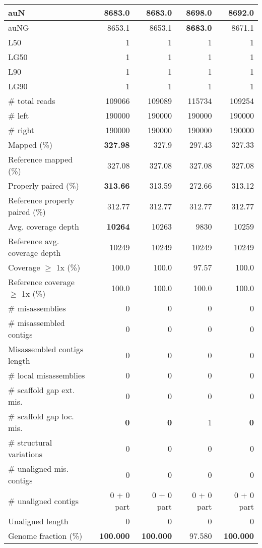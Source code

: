 \documentclass[12pt,a4paper]{article}
\begin{document}
\begin{table}[ht]
\begin{center}
\begin{tabular}{|l*{4}{|r}|}
auN & 8683.0 & 8683.0 & {\bf 8698.0} & 8692.0 \\ \hline
auNG & 8653.1 & 8653.1 & {\bf 8683.0} & 8671.1 \\ \hline
L50 & 1 & 1 & 1 & 1 \\ \hline
LG50 & 1 & 1 & 1 & 1 \\ \hline
L90 & 1 & 1 & 1 & 1 \\ \hline
LG90 & 1 & 1 & 1 & 1 \\ \hline
\# total reads & 109066 & 109089 & 115734 & 109254 \\ \hline
\# left & 190000 & 190000 & 190000 & 190000 \\ \hline
\# right & 190000 & 190000 & 190000 & 190000 \\ \hline
Mapped (\%) & {\bf 327.98} & 327.9 & 297.43 & 327.33 \\ \hline
Reference mapped (\%) & 327.08 & 327.08 & 327.08 & 327.08 \\ \hline
Properly paired (\%) & {\bf 313.66} & 313.59 & 272.66 & 313.12 \\ \hline
Reference properly paired (\%) & 312.77 & 312.77 & 312.77 & 312.77 \\ \hline
Avg. coverage depth & {\bf 10264} & 10263 & 9830 & 10259 \\ \hline
Reference avg. coverage depth & 10249 & 10249 & 10249 & 10249 \\ \hline
Coverage $\geq$ 1x (\%) & 100.0 & 100.0 & 97.57 & 100.0 \\ \hline
Reference coverage $\geq$ 1x (\%) & 100.0 & 100.0 & 100.0 & 100.0 \\ \hline
\# misassemblies & 0 & 0 & 0 & 0 \\ \hline
\# misassembled contigs & 0 & 0 & 0 & 0 \\ \hline
Misassembled contigs length & 0 & 0 & 0 & 0 \\ \hline
\# local misassemblies & 0 & 0 & 0 & 0 \\ \hline
\# scaffold gap ext. mis. & 0 & 0 & 0 & 0 \\ \hline
\# scaffold gap loc. mis. & {\bf 0} & {\bf 0} & 1 & {\bf 0} \\ \hline
\# structural variations & 0 & 0 & 0 & 0 \\ \hline
\# unaligned mis. contigs & 0 & 0 & 0 & 0 \\ \hline
\# unaligned contigs & 0 + 0 part & 0 + 0 part & 0 + 0 part & 0 + 0 part \\ \hline
Unaligned length & 0 & 0 & 0 & 0 \\ \hline
Genome fraction (\%) & {\bf 100.000} & {\bf 100.000} & 97.580 & {\bf 100.000} \\ \hline

\end{tabular}
\end{center}
\end{table}
\end{document}
